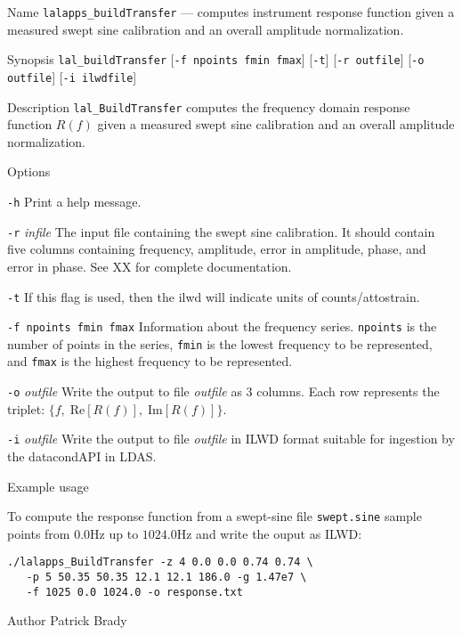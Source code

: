 \begin{entry}

\item[Name]
\verb$lalapps_buildTransfer$ --- computes instrument response function
given a measured swept sine calibration and an overall amplitude
normalization.    

\item[Synopsis]
\verb$lal_buildTransfer$ [\verb$-f npoints fmin fmax$] [\verb$-t$]
                         [\verb$-r outfile$] [\verb$-o outfile$] [\verb$-i ilwdfile$]
                         
\item[Description]
\verb$lal_BuildTransfer$ computes the frequency domain response
function $R(f)$ given a measured swept sine calibration and an overall
amplitude normalization.   

\item[Options]\leavevmode
\begin{entry}
\item[\texttt{-h}]
Print a help message.
\item[\texttt{-r} \textit{infile}]
The input file containing the swept sine calibration.   It should
contain five columns containing frequency, amplitude, error in
amplitude, phase, and error in phase.  See XX for complete
documentation.  
\item[\texttt{-t}]
If this flag is used,  then the ilwd will indicate units of
counts/attostrain.  
\item[\texttt{-f npoints fmin fmax}] 
Information about the frequency series.  \verb$npoints$ is the number
of points in the series,  \verb$fmin$ is the lowest frequency to be
represented,  and \verb$fmax$ is the highest frequency to be
represented.   
\item[\texttt{-o} \textit{outfile}]
Write the output to file \textit{outfile} as 3 columns.  Each row
represents the triplet: $\{f,\; \textrm{Re}[R(f)],\; \textrm{Im}[R(f)]\}$.
\item[\texttt{-i} \textit{outfile}]
Write the output to file \textit{outfile} in ILWD format suitable for
ingestion by the datacondAPI in LDAS.
\end{entry}

\item[Example usage]

To compute the response function from a swept-sine file
\texttt{swept.sine} sample points from $0.0$Hz up to $1024.0$Hz and
write the ouput as ILWD:
\begin{verbatim}
./lalapps_BuildTransfer -z 4 0.0 0.0 0.74 0.74 \
   -p 5 50.35 50.35 12.1 12.1 186.0 -g 1.47e7 \
   -f 1025 0.0 1024.0 -o response.txt
\end{verbatim}

\item[Author]
Patrick Brady

\end{entry}
